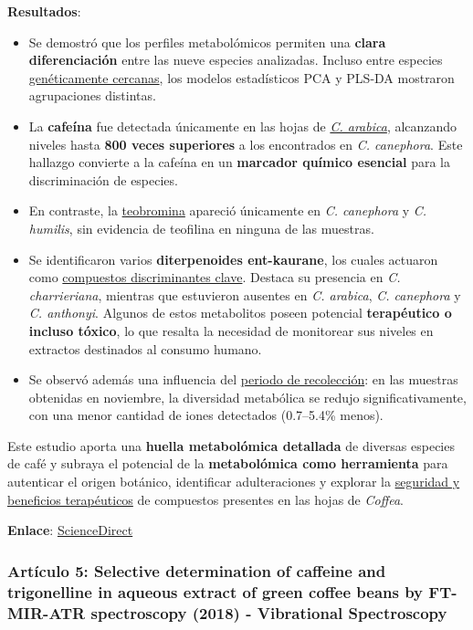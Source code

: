 \documentclass{article}
\begin{document}
\textbf{Resultados}:  
\begin{itemize}
	\item Se demostró que los perfiles metabolómicos permiten una \textbf{clara diferenciación} entre las nueve especies analizadas. Incluso entre especies \underline{genéticamente cercanas}, los modelos estadísticos PCA y PLS-DA mostraron agrupaciones distintas.  
	\item La \textbf{cafeína} fue detectada únicamente en las hojas de \underline{\textit{C. arabica}}, alcanzando niveles hasta \textbf{800 veces superiores} a los encontrados en \textit{C. canephora}. Este hallazgo convierte a la cafeína en un \textbf{marcador químico esencial} para la discriminación de especies.  
	\item En contraste, la \underline{teobromina} apareció únicamente en \textit{C. canephora} y \textit{C. humilis}, sin evidencia de teofilina en ninguna de las muestras.  
	\item Se identificaron varios \textbf{diterpenoides ent-kaurane}, los cuales actuaron como \underline{compuestos discriminantes clave}. Destaca su presencia en \textit{C. charrieriana}, mientras que estuvieron ausentes en \textit{C. arabica}, \textit{C. canephora} y \textit{C. anthonyi}. Algunos de estos metabolitos poseen potencial \textbf{terapéutico o incluso tóxico}, lo que resalta la necesidad de monitorear sus niveles en extractos destinados al consumo humano.  
	\item Se observó además una influencia del \underline{periodo de recolección}: en las muestras obtenidas en noviembre, la diversidad metabólica se redujo significativamente, con una menor cantidad de iones detectados (0.7–5.4\% menos).  
\end{itemize} \vspace{0.5cm}

Este estudio aporta una \textbf{huella metabolómica detallada} de diversas especies de café y subraya el potencial de la \textbf{metabolómica como herramienta} para autenticar el origen botánico, identificar adulteraciones y explorar la \underline{seguridad y beneficios terapéuticos} de compuestos presentes en las hojas de \textit{Coffea}. \vspace{0.5cm}

\textbf{Enlace}: \href{https://www.sciencedirect.com/science/article/abs/pii/S0308814617316515}{ScienceDirect} \vspace{0.5cm}



\subsubsection{\textbf{Artículo 5:} \textcolor{blue-violet}{\textbf{Selective determination of caffeine and trigonelline in aqueous extract of green coffee beans by FT-MIR-ATR spectroscopy (2018) - Vibrational Spectroscopy}}} \vspace{0.5cm}
\end{document}
